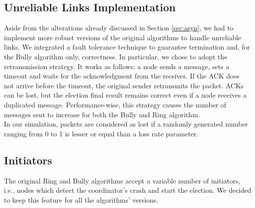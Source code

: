 \documentclass[10pt,journal,compsoc]{IEEEtran}
\begin{document}
\subsection{Unreliable Links Implementation}
\label{sec:unrel_implementation}
Aside from the alterations already discussed in Section \ref{sec:asyn}, we had
to implement more robust versions of the original algorithms to handle
unreliable links. We integrated a fault tolerance technique to guarantee
termination and, for the Bully algorithm only, correctness. In particular,
we chose to adopt the retransmission strategy. It works as follows: a node sends
a message, sets a timeout and waits for the acknowledgment from the receiver.
If the ACK does not arrive before the timeout, the original sender retransmits
the packet. ACKs can be lost, but the election final result remains correct even
if a node receives a duplicated message. Performance-wise, this strategy causes
the number of messages sent to increase for both the Bully and Ring algorithm.
\\In our simulation, packets are considered as lost if a randomly generated
number ranging from 0 to 1 is lesser or equal than a loss rate parameter.
\subsection{Initiators}
The original Ring and Bully algorithms accept a variable number of initiators,
i.e., nodes which detect the coordinator's crash and start the election. We
decided to keep this feature for all the algorithms' versions.
\end{document}
